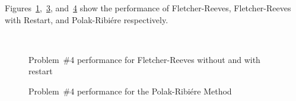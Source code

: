 Figures~\ref{fig:p04:FR},~\ref{fig:p04:FRwithRestart}, and~\ref{fig:p04:PR} show the performance of Fletcher-Reeves, Fletcher-Reeves with Restart, and Polak-Ribi\'{e}re respectively.


\newpage
\begin{figure}
  \centering
  \begin{subfigure}[t]{0.48\textwidth}
    
    \caption{}\label{fig:p04:FR}
  \end{subfigure}
  ~
  \begin{subfigure}[t]{0.48\textwidth}
    
    \caption{}\label{fig:p04:FRwithRestart}
  \end{subfigure}
  \caption{Problem~\#4 performance for Fletcher-Reeves without and with restart}
\end{figure}

\begin{figure}
  \centering
  
  \caption{Problem~\#4 performance for the Polak-Ribi\'{e}re Method}\label{fig:p04:PR}
\end{figure}
